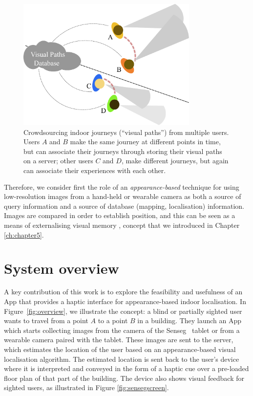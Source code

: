 \begin{figure}[h]
\centering
\includegraphics[width=0.8\textwidth]{./gfx/Chapter06/AssociatingViews.pdf}
\caption{Crowdsourcing indoor journeys (``visual paths'') from multiple users.  Users $A$ and $B$ make the same journey at different points in time, but can associate their journeys through storing their visual paths on a server; other users $C$ and $D$, make different journeys, but again can associate their experiences with each other.}
\label{fig:associatingViews}
\end{figure}

Therefore, we consider first the role of an {\em appearance-based} technique for using low-resolution images from a hand-held or wearable camera as both a source of query information and a source of database (mapping, localisation) information. Images are compared in order to establish position, and this can be seen as a means of externalising visual memory \citep{tversky2000some}, concept that we introduced in Chapter \ref{ch:chapter5}. 

\section{System overview}
\label{sec:overview}

A key contribution of this work is to explore the feasibility and usefulness of an App that provides a haptic interface for appearance-based indoor localisation. In Figure~\ref{fig:overview}, we illustrate the concept: a blind or partially sighted user wants to travel from a point $A$ to a point $B$ in a building. They launch an App which starts collecting images from the camera of the Senseg\texttrademark~ tablet or from a wearable camera paired with the tablet. These images are sent to the server, which estimates the location of the user based on an appearance-based visual localisation algorithm. The estimated location is sent back to the user's device where it is interpreted and conveyed in the form of a haptic cue over a pre-loaded floor plan of that part of the building. The device also shows visual feedback for sighted users, as illustrated in Figure \ref{fig:sensegscreen}.



